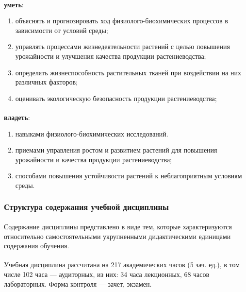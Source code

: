 \paragraph*{}\textbf{уметь}: 

\begin{enumerate}

\item объяснять и прогнозировать ход физиолого-биохимических процессов в зависимости от условий среды;
\item управлять процессами жизнедеятельности растений с целью повышения урожайности и улучшения качества продукции растениеводства;
\item определять жизнеспособность растительных тканей при воздействии на них различных факторов;
\item оценивать экологическую безопасность продукции растениеводства; 

\end{enumerate}

\paragraph*{}\textbf{владеть}:

\begin{enumerate}

\item навыками физиолого-биохимических исследований.
\item приемами управления ростом и развитием растений для повышения урожайности и качества продукции растениеводства;
\item способами повышения устойчивости растений к неблагоприятным условиям среды.

\end{enumerate}

\subsubsection{Структура содержания учебной дисциплины}

\paragraph*{}Содержание дисциплины представлено в виде тем, которые характеризуются относительно самостоятельными укрупненными дидактическими единицами содержания обучения.

\paragraph*{}Учебная дисциплина рассчитана на 217 академических часов (5 зач. ед.), в том числе 102 часа — аудиторных, из них: 34 часа лекционных, 68 часов лабораторных. Форма контроля — зачет, экзамен.

